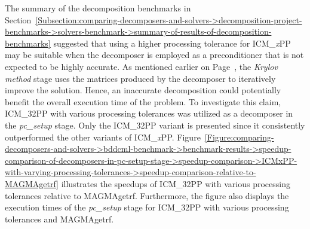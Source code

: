 The summary of the decomposition benchmarks in Section~\ref{Subsection:comparing-decomposers-and-solvers->decomposition-project-benchmarks->solvers-benchmark->summary-of-results-of-decomposition-benchmarks} suggested that using a higher processing tolerance for ICM\_\textit{x}PP may be suitable when the decomposer is employed as a preconditioner that is not expected to be highly accurate.
As mentioned earlier on Page~\pageref{Text:comparing-decomposers-and-solvers->bddcml-benchmark->poisson-on-cube-stages}, the \textit{Krylov method} stage uses the  matrices produced by the decomposer to iteratively improve the solution.
Hence, an inaccurate decomposition could potentially benefit the overall execution time of the problem.
To investigate this claim, ICM\_32PP with various processing tolerances was utilized as a decomposer in the \textit{pc\_setup} stage.
Only the ICM\_32PP variant is presented since it consistently outperformed the other variants of ICM\_\textit{x}PP.
Figure~\ref{Figure:comparing-decomposers-and-solvers->bddcml-benchmark->benchmark-results->speedup-comparison-of-decomposers-in-pc-setup-stage->speedup-comparison->ICMxPP-with-varying-processing-tolerances->speedup-comparison-relative-to-MAGMAgetrf} illustrates the speedups of ICM\_32PP with various processing tolerances relative to MAGMAgetrf.
Furthermore, the figure also displays the execution times of the \textit{pc\_setup} stage for ICM\_32PP with various processing tolerances and MAGMAgetrf.

